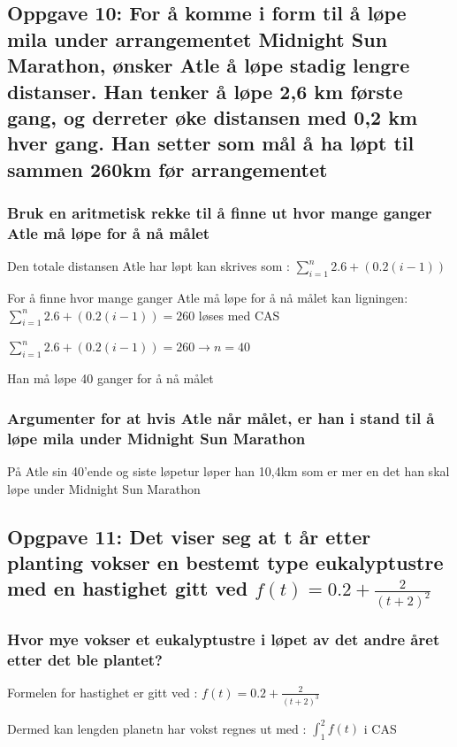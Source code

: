 \documentclass{article}
\begin{document}
\subsection{Oppgave 10: For å komme i form til å løpe mila under arrangementet Midnight Sun Marathon, ønsker Atle å løpe stadig lengre distanser. Han tenker å løpe 2,6 km første gang, og derreter øke distansen med 0,2 km hver gang. Han setter som mål å ha løpt til sammen 260km før arrangementet}

\subsubsection{Bruk en aritmetisk rekke til å finne ut hvor mange ganger Atle må løpe for å nå målet}

Den totale distansen Atle har løpt kan skrives som : $\sum^n_{i=1} 2.6+(0.2(i-1))$

For å finne hvor mange ganger Atle må løpe for å nå målet kan ligningen: $\sum^n_{i=1} 2.6+(0.2(i-1))=260$ løses med CAS

$\sum^n_{i=1} 2.6+(0.2(i-1))=260 \rightarrow n = 40$

Han må løpe 40 ganger for å nå målet

\subsubsection{Argumenter for at hvis Atle når målet, er han i stand til å løpe mila under Midnight Sun Marathon}

På Atle sin 40'ende og siste løpetur løper han 10,4km som er mer en det han skal løpe under Midnight Sun Marathon

\subsection{Opgpave 11: Det viser seg at t år etter planting vokser en bestemt type eukalyptustre med en hastighet gitt ved $f(t)=0.2+\frac{2}{(t+2)^2}$}

\subsubsection{Hvor mye vokser et eukalyptustre i løpet av det andre året etter det ble plantet?}

Formelen for hastighet er gitt ved :  $f(t)=0.2+\frac{2}{(t+2)^3}$

Dermed kan lengden planetn har vokst regnes ut med : $\int_{1}^{2}f(t)$ i CAS
\end{document}

